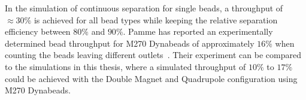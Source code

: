 In the simulation of continuous separation for single beads, a throughput of $\approx30\%$ is achieved for all bead types while keeping the relative separation efficiency between $80\%$ and $90\%$. Pamme \etal{} has reported an experimentally determined bead throughput for M270 Dynabeads of approximately $16\%$ when counting the beads leaving different outlets~\cite{Pamme2006b}. Their experiment can be compared to the simulations in this thesis, where a simulated throughput of $10\%$ to $17\%$ could be achieved with the Double Magnet and Quadrupole configuration using M270 Dynabeads.

%
%
%
%
%

